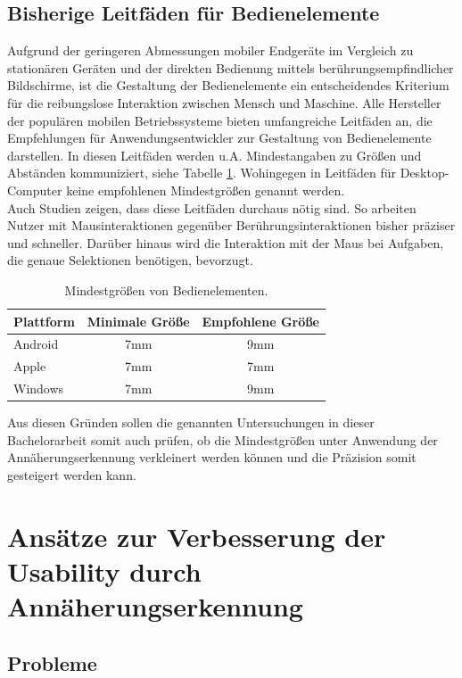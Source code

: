 \documentclass[a4paper,12pt,bibliography=totoc]{scrreprt}%
\begin{document}
\section{Bisherige Leitfäden für Bedienelemente}
Aufgrund der geringeren Abmessungen mobiler Endgeräte im Vergleich zu stationären Geräten und der direkten Bedienung mittels berührungsempfindlicher Bildschirme, ist die Gestaltung der Bedienelemente ein entscheidendes Kriterium für die reibungslose Interaktion zwischen Mensch und Maschine. Alle Hersteller der populären mobilen Betriebssysteme bieten umfangreiche Leitfäden an, die Empfehlungen für Anwendungsentwickler zur Gestaltung von Bedienelemente darstellen. In diesen Leitfäden werden u.A. Mindestangaben zu Größen und Abständen kommuniziert, siehe Tabelle \ref{leitfadenalle}. Wohingegen in Leitfäden für Desktop-Computer keine empfohlenen Mindestgrößen genannt werden.\\
Auch Studien zeigen, dass diese Leitfäden durchaus nötig sind. So arbeiten Nutzer mit Mausinteraktionen gegenüber Berührungsinteraktionen bisher präziser und schneller. Darüber hinaus wird die Interaktion mit der Maus bei Aufgaben, die genaue Selektionen benötigen, bevorzugt.\citep{touchmouse}
\begin{table}
\centering
\renewcommand{\arraystretch}{2}
\setlength{\tabcolsep}{15pt}
\begin{tabular}{ l c c }
Plattform & Minimale Größe & Empfohlene Größe\\\hline
Android \cite{androidrichtlinien} & 7mm & 9mm\\
Apple \cite{applerichtlinien} & 7mm & 7mm\\
Windows \cite{winrichtlinien} & 7mm & 9mm\\
\end{tabular}
\caption{Mindestgrößen von Bedienelementen.}
\label{leitfadenalle}
\end{table}
Aus diesen Gründen sollen die genannten Untersuchungen in dieser Bachelorarbeit somit auch prüfen, ob die Mindestgrößen unter Anwendung der Annäherungserkennung verkleinert werden können und die Präzision somit gesteigert werden kann.

\chapter{Ansätze zur Verbesserung der Usability durch Annäherungserkennung}
\section{Probleme}
\end{document}
